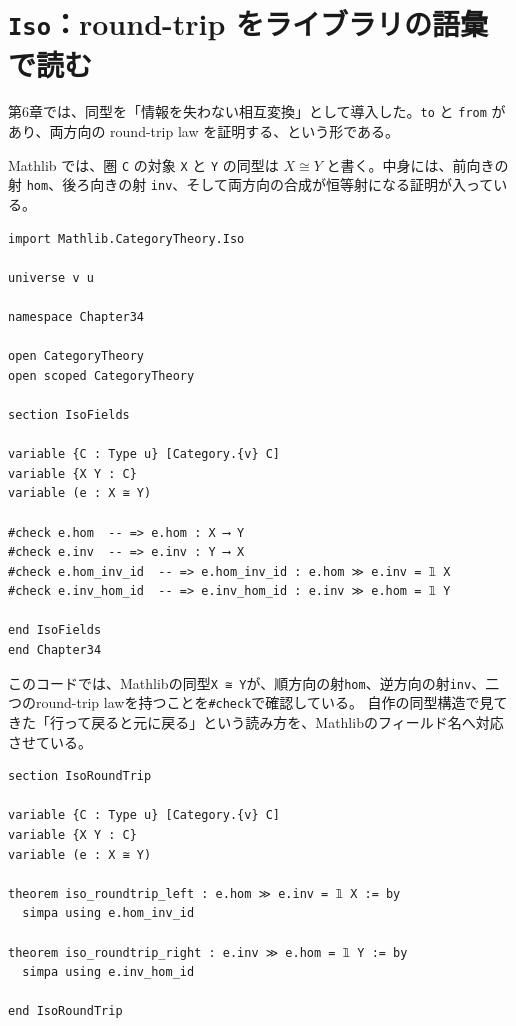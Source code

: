 \section{\texttt{Iso}：round-trip をライブラリの語彙で読む}

第6章では、同型を「情報を失わない相互変換」として導入した。\texttt{to} と \texttt{from} があり、両方向の round-trip law を証明する、という形である。

Mathlib では、圏 \texttt{C} の対象 \texttt{X} と \texttt{Y} の同型は \(X \cong Y\) と書く。中身には、前向きの射 \texttt{hom}、後ろ向きの射 \texttt{inv}、そして両方向の合成が恒等射になる証明が入っている。

\begin{listing}[htbp]
\begin{verbatim}
import Mathlib.CategoryTheory.Iso

universe v u

namespace Chapter34

open CategoryTheory
open scoped CategoryTheory

section IsoFields

variable {C : Type u} [Category.{v} C]
variable {X Y : C}
variable (e : X ≅ Y)

#check e.hom  -- => e.hom : X ⟶ Y
#check e.inv  -- => e.inv : Y ⟶ X
#check e.hom_inv_id  -- => e.hom_inv_id : e.hom ≫ e.inv = 𝟙 X
#check e.inv_hom_id  -- => e.inv_hom_id : e.inv ≫ e.hom = 𝟙 Y

end IsoFields
end Chapter34
\end{verbatim}
\caption{Iso を round-trip として読む}
\label{lst:ch34_iso_basic}
\end{listing}

このコードでは、Mathlibの同型\texttt{X ≅ Y}が、順方向の射\texttt{hom}、逆方向の射\texttt{inv}、二つのround-trip lawを持つことを\texttt{\#check}で確認している。
自作の同型構造で見てきた「行って戻ると元に戻る」という読み方を、Mathlibのフィールド名へ対応させている。

\begin{listing}[htbp]
\begin{verbatim}
section IsoRoundTrip

variable {C : Type u} [Category.{v} C]
variable {X Y : C}
variable (e : X ≅ Y)

theorem iso_roundtrip_left : e.hom ≫ e.inv = 𝟙 X := by
  simpa using e.hom_inv_id

theorem iso_roundtrip_right : e.inv ≫ e.hom = 𝟙 Y := by
  simpa using e.inv_hom_id

end IsoRoundTrip
\end{verbatim}
\caption{同型の二つの round-trip law}
\label{lst:ch34_iso_roundtrip}
\end{listing}

